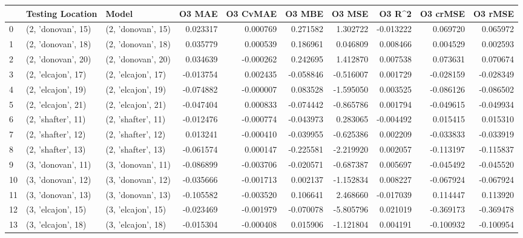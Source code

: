 \begin{tabular}{lllrrrrrrr}
\toprule
{} &    Testing Location &               Model &    O3 MAE &  O3 CvMAE &    O3 MBE &    O3 MSE &    O3 R\textasciicircum2 &  O3 crMSE &   O3 rMSE \\
\midrule
0  &  (2, 'donovan', 15) &  (2, 'donovan', 15) &  0.023317 &  0.000769 &  0.271582 &  1.302722 & -0.013222 &  0.069720 &  0.065972 \\
1  &  (2, 'donovan', 18) &  (2, 'donovan', 18) &  0.035779 &  0.000539 &  0.186961 &  0.046809 &  0.008466 &  0.004529 &  0.002593 \\
2  &  (2, 'donovan', 20) &  (2, 'donovan', 20) &  0.034639 & -0.000262 &  0.242695 &  1.412870 &  0.007538 &  0.073631 &  0.070674 \\
3  &  (2, 'elcajon', 17) &  (2, 'elcajon', 17) & -0.013754 &  0.002435 & -0.058846 & -0.516007 &  0.001729 & -0.028159 & -0.028349 \\
4  &  (2, 'elcajon', 19) &  (2, 'elcajon', 19) & -0.074882 & -0.000007 &  0.083528 & -1.595050 &  0.003525 & -0.086126 & -0.086502 \\
5  &  (2, 'elcajon', 21) &  (2, 'elcajon', 21) & -0.047404 &  0.000833 & -0.074442 & -0.865786 &  0.001794 & -0.049615 & -0.049934 \\
6  &  (2, 'shafter', 11) &  (2, 'shafter', 11) & -0.012476 & -0.000774 & -0.043973 &  0.283065 & -0.004492 &  0.015415 &  0.015310 \\
7  &  (2, 'shafter', 12) &  (2, 'shafter', 12) &  0.013241 & -0.000410 & -0.039955 & -0.625386 &  0.002209 & -0.033833 & -0.033919 \\
8  &  (2, 'shafter', 13) &  (2, 'shafter', 13) & -0.061574 &  0.000147 & -0.225581 & -2.219920 &  0.002057 & -0.113197 & -0.115837 \\
9  &  (3, 'donovan', 11) &  (3, 'donovan', 11) & -0.086899 & -0.003706 & -0.020571 & -0.687387 &  0.005697 & -0.045492 & -0.045520 \\
10 &  (3, 'donovan', 12) &  (3, 'donovan', 12) & -0.035666 & -0.001713 &  0.002137 & -1.152834 &  0.008227 & -0.067924 & -0.067924 \\
11 &  (3, 'donovan', 13) &  (3, 'donovan', 13) & -0.105582 & -0.003520 &  0.106641 &  2.468660 & -0.017039 &  0.114447 &  0.113920 \\
12 &  (3, 'elcajon', 15) &  (3, 'elcajon', 15) & -0.023469 & -0.001979 & -0.070078 & -5.805796 &  0.021019 & -0.369173 & -0.369478 \\
13 &  (3, 'elcajon', 18) &  (3, 'elcajon', 18) & -0.015304 & -0.000408 &  0.015906 & -1.121804 &  0.004191 & -0.100932 & -0.100954 \\

\end{tabular}
